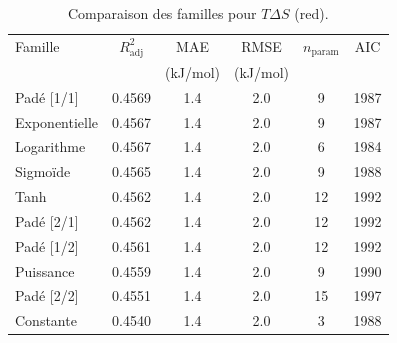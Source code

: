 \begin{table}[htbp]
\centering
\footnotesize
\caption{Comparaison des familles pour $T\Delta S$ (red).}
\label{tab:s4_tds_red_families}
\begin{tabular}{lccccc}
\toprule
Famille & $R^2_{\mathrm{adj}}$ & MAE & RMSE & $n_{\mathrm{param}}$ & AIC \\
 & & (kJ/mol) & (kJ/mol) & & \\
\midrule
Padé [1/1] & 0.4569 & 1.4 & 2.0 & 9 & 1987 \\
Exponentielle & 0.4567 & 1.4 & 2.0 & 9 & 1987 \\
Logarithme & 0.4567 & 1.4 & 2.0 & 6 & 1984 \\
Sigmoïde & 0.4565 & 1.4 & 2.0 & 9 & 1988 \\
Tanh & 0.4562 & 1.4 & 2.0 & 12 & 1992 \\
Padé [2/1] & 0.4562 & 1.4 & 2.0 & 12 & 1992 \\
Padé [1/2] & 0.4561 & 1.4 & 2.0 & 12 & 1992 \\
Puissance & 0.4559 & 1.4 & 2.0 & 9 & 1990 \\
Padé [2/2] & 0.4551 & 1.4 & 2.0 & 15 & 1997 \\
Constante & 0.4540 & 1.4 & 2.0 & 3 & 1988 \\
\bottomrule
\end{tabular}
\end{table}